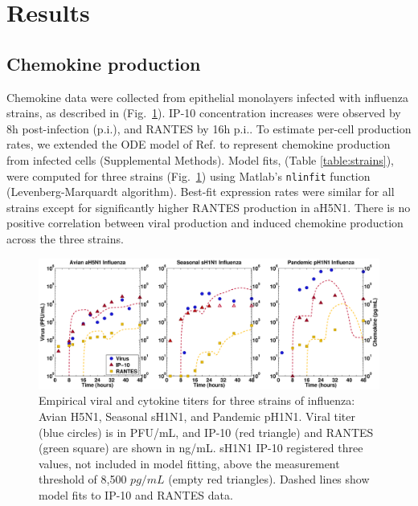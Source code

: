 \documentclass[10pt]{article}
\begin{document}
\section*{Results}

\subsection*{Chemokine production}

Chemokine data were collected from epithelial monolayers infected with influenza strains, as described in \cite{Mitchell2011} (Fig.~\ref{fig:data}).  IP-10 concentration increases were observed by 8h post-infection (p.i.), and RANTES by 16h p.i..  To estimate per-cell production rates, we extended the ODE model of Ref. \cite{Mitchell2011} to represent chemokine production from infected cells (Supplemental Methods).  Model fits, (Table \ref{table:strains}), were computed for three strains (Fig.~\ref{fig:data}) using Matlab's \texttt{nlinfit} function (Levenberg-Marquardt algorithm).  Best-fit expression rates were similar for all strains except for significantly higher RANTES production in aH5N1.  There is no positive correlation between viral production and induced chemokine production across the three strains.

\begin{figure}[ht!]
\begin{center}
 \includegraphics[width=\textwidth]{data}
 \end{center}
\caption{Empirical viral and cytokine titers for three strains of influenza: Avian H5N1, Seasonal sH1N1, and Pandemic pH1N1.  Viral titer (blue circles) is in PFU/mL, and IP-10 (red triangle) and RANTES (green square) are shown in ng/mL.  sH1N1 IP-10 registered three values, not included in model fitting, above the measurement threshold of 8,500 $pg/mL$ (empty red triangles).  Dashed lines show model fits to IP-10 and RANTES data.} 
 \label{fig:data}
\end{figure}
\end{document}
